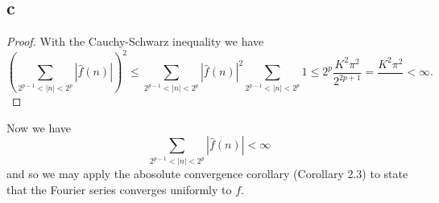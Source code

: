 \documentclass{article}
\begin{document}
\subsection*{c}

\begin{proof}
    With the Cauchy-Schwarz inequality we have
    \[
    \left(\sum\limits_{2^{p - 1} < |n| < 2^p} |\hat{f}(n)| \right)^2 \leq \sum\limits_{2^{p - 1} < |n| < 2^p}|\hat{f}(n)|^2 \sum\limits_{2^{p-1}< |n| < 2^p}1 \leq 2^p\frac{K^2\pi^2}{2^{2p + 1}} = \frac{K^2\pi^2}{} < \infty.
    \]
\end{proof}
Now we have 
\[
    \sum\limits_{2^{p-1} < |n| < 2^p} |\hat{f}(n)| < \infty
\]
and so we may apply the abosolute convergence corollary (Corollary 2.3) to state that the Fourier series converges uniformly to $f$. 
\end{document}
